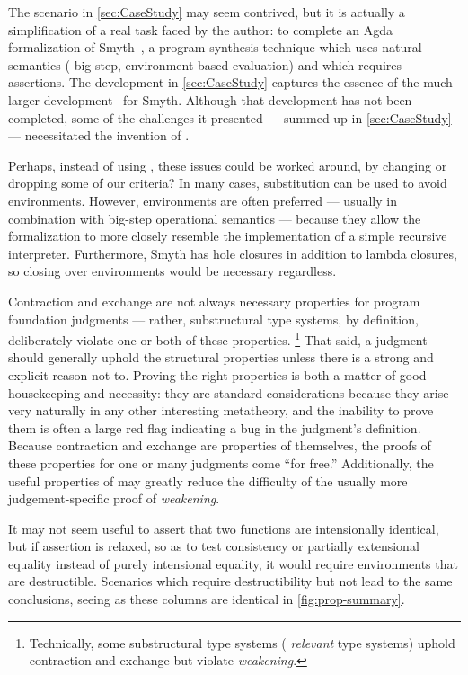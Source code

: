 
The scenario in \autoref{sec:CaseStudy} may seem contrived, but it is actually a simplification of a real task faced by the author:
%
to complete an Agda formalization of Smyth~\citep{smyth}, a program synthesis technique which uses
natural semantics (\ie{} big-step, environment-based evaluation) and which requires assertions.
%
The development in \autoref{sec:CaseStudy} captures the essence of the much larger development~\citep{github:smyth:agda} for Smyth.
%
Although that development has not been completed, some of the challenges it presented --- summed up in \autoref{sec:CaseStudy} --- necessitated the invention of \dds.

Perhaps, instead of using \dds, these issues could be worked around, by changing or dropping some of our criteria?
In many cases, substitution can be used to avoid environments. However, environments are often preferred --- usually in combination with big-step operational semantics --- because
they allow the formalization to more closely resemble the implementation of a simple recursive interpreter. Furthermore,
Smyth has hole closures in addition to lambda closures, so closing over environments would be necessary regardless.

Contraction and exchange are not always necessary properties for program foundation judgments ---
rather, substructural type systems, by definition, deliberately violate one or both of these properties.%
\footnote{\hspace{0.01in}Technically, some substructural type systems (\eg{} \emph{relevant} type systems) uphold contraction and exchange but violate \emph{weakening}.}
That said, a judgment should generally uphold the structural properties unless there is a strong and explicit
reason not to. Proving the right properties
is both a matter of good housekeeping and necessity: they are standard
considerations because they arise very naturally in any other
interesting metatheory, and the inability to prove them is often a large red flag indicating a bug in the judgment's definition.
Because contraction and exchange are properties of \dds{} themselves,
the proofs of these properties for one or many judgments come ``for free.''
Additionally, the useful properties of \dds{} may greatly reduce the difficulty of the usually
more judgement-specific proof of \emph{weakening}.

It may not seem useful to assert that two functions are intensionally identical, but if assertion is relaxed,
so as to test consistency or partially extensional equality instead of purely intensional equality,
it would require environments that are destructible.
Scenarios which require destructibility but not \EqDec{} lead to the same conclusions,
seeing as these columns are identical in \autoref{fig:prop-summary}.

